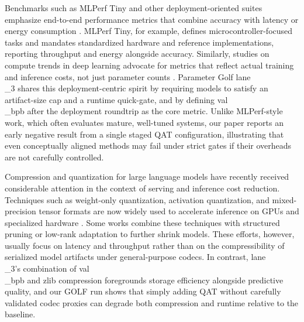 \documentclass{article}
\begin{document}
Benchmarks such as MLPerf Tiny and other deployment-oriented suites emphasize end-to-end performance metrics that combine accuracy with latency or energy consumption \cite{banbury2021mlperf}. MLPerf Tiny, for example, defines microcontroller-focused tasks and mandates standardized hardware and reference implementations, reporting throughput and energy alongside accuracy. Similarly, studies on compute trends in deep learning advocate for metrics that reflect actual training and inference costs, not just parameter counts \cite{desislavov2021compute}. Parameter Golf lane\\_3 shares this deployment-centric spirit by requiring models to satisfy an artifact-size cap and a runtime quick-gate, and by defining val\\_bpb after the deployment roundtrip as the core metric. Unlike MLPerf-style work, which often evaluates mature, well-tuned systems, our paper reports an early negative result from a single staged QAT configuration, illustrating that even conceptually aligned methods may fail under strict gates if their overheads are not carefully controlled.

Compression and quantization for large language models have recently received considerable attention in the context of serving and inference cost reduction. Techniques such as weight-only quantization, activation quantization, and mixed-precision tensor formats are now widely used to accelerate inference on GPUs and specialized hardware \cite{dettmers2022llm, lin2023awq}. Some works combine these techniques with structured pruning or low-rank adaptation to further shrink models. These efforts, however, usually focus on latency and throughput rather than on the compressibility of serialized model artifacts under general-purpose codecs. In contrast, lane\\_3's combination of val\\_bpb and zlib compression foregrounds storage efficiency alongside predictive quality, and our GOLF run shows that simply adding QAT without carefully validated codec proxies can degrade both compression and runtime relative to the baseline.
\end{document}
